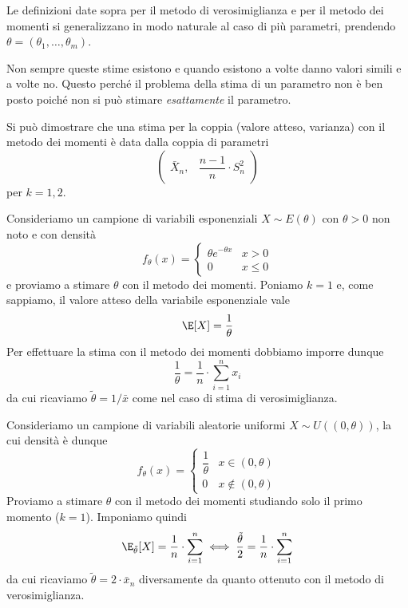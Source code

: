Le definizioni date sopra per il metodo di verosimiglianza e per il metodo dei momenti si
generalizzano in modo naturale al caso di più parametri, prendendo
$\theta = (\theta_1, \dots, \theta_m)$.

Non sempre queste stime esistono e quando esistono a volte danno valori simili e a volte no. Questo
perché il problema della stima di un parametro non è ben posto poiché non si può stimare
\emph{esattamente} il parametro.

Si può dimostrare che una stima per la coppia (valore atteso, varianza) con il metodo dei momenti
è data dalla coppia di parametri
\[ \begin{pmatrix} \bar{X}_n, & \dfrac{n-1}{n} \cdot S_n^2 \end{pmatrix} \]
per $k = 1, 2$.

\begin{example}
	Consideriamo un campione di variabili esponenziali $X \sim E(\theta)$ con $\theta > 0$ non noto
	e con densità
	\[
		f_\theta(x) = \begin{cases}
			\theta e^{-\theta x} & x > 0    \\
			0                    & x \leq 0
		\end{cases}
	\]
	e proviamo a stimare $\theta$ con il metodo dei momenti. Poniamo $k=1$ e, come sappiamo, il
	valore atteso della variabile esponenziale vale
	\[ \E[X] = \frac{1}{\theta} \]
	Per effettuare la stima con il metodo dei momenti dobbiamo imporre dunque
	\[ \frac{1}{\theta} = \frac{1}{n} \cdot \sum_{i=1}^n x_i \]
	da cui ricaviamo $\tilde{\theta} = 1 / \bar{x}$ come nel caso di stima di verosimiglianza.
\end{example}

\begin{example}
	Consideriamo un campione di variabili aleatorie uniformi $X \sim U((0, \theta))$, la cui
	densità è dunque
	\[
		f_\theta(x) = \begin{cases}
			\dfrac{1}{\theta} & x \in (0, \theta)    \\[2ex]
			0                 & x \notin (0, \theta)
		\end{cases}
	\]
	Proviamo a stimare $\theta$ con il metodo dei momenti studiando solo il primo momento ($k=1$).
	Imponiamo quindi
	\[
		\E_{\tilde{\theta}}[X] = \frac{1}{n} \cdot \sum_{i=1}^n \iff
		\frac{\tilde{\theta}}{2} = \frac{1}{n} \cdot \sum_{i=1}^n
	\]
	da cui ricaviamo $\tilde{\theta} = 2 \cdot \bar{x}_n$ diversamente da quanto ottenuto
	con il metodo di verosimiglianza.
\end{example}